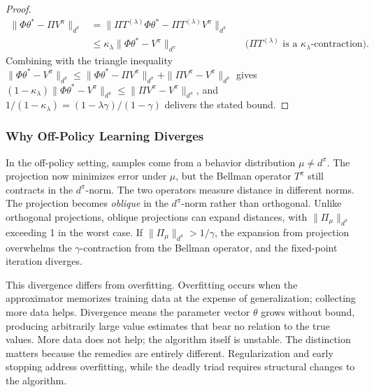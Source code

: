 \begin{proof}
\begin{align*}
\|\Phi\theta^* - \Pi V^\pi\|_{d^\pi}
  &= \|\Pi T^{(\lambda)} \Phi\theta^* - \Pi T^{(\lambda)} V^\pi\|_{d^\pi} \\
  &\leq \kappa_\lambda \|\Phi\theta^* - V^\pi\|_{d^\pi}
    && \text{($\Pi T^{(\lambda)}$ is a $\kappa_\lambda$-contraction).}
\end{align*}
Combining with the triangle inequality $\|\Phi\theta^* - V^\pi\|_{d^\pi} \leq \|\Phi\theta^* - \Pi V^\pi\|_{d^\pi} + \|\Pi V^\pi - V^\pi\|_{d^\pi}$ gives $(1 - \kappa_\lambda)\|\Phi\theta^* - V^\pi\|_{d^\pi} \leq \|\Pi V^\pi - V^\pi\|_{d^\pi}$, and $1/(1-\kappa_\lambda) = (1-\lambda\gamma)/(1-\gamma)$ delivers the stated bound.
\end{proof}

\subsubsection{Why Off-Policy Learning Diverges}

In the off-policy setting, samples come from a behavior distribution $\mu \neq d^\pi$. The projection now minimizes error under $\mu$, but the Bellman operator $T^\pi$ still contracts in the $d^\pi$-norm. The two operators measure distance in different norms. The projection becomes \emph{oblique} in the $d^\pi$-norm rather than orthogonal. Unlike orthogonal projections, oblique projections can expand distances, with $\|\Pi_\mu\|_{d^\pi}$ exceeding 1 in the worst case. If $\|\Pi_\mu\|_{d^\pi} > 1/\gamma$, the expansion from projection overwhelms the $\gamma$-contraction from the Bellman operator, and the fixed-point iteration diverges.

This divergence differs from overfitting. Overfitting occurs when the approximator memorizes training data at the expense of generalization; collecting more data helps. Divergence means the parameter vector $\theta$ grows without bound, producing arbitrarily large value estimates that bear no relation to the true values. More data does not help; the algorithm itself is unstable. The distinction matters because the remedies are entirely different. Regularization and early stopping address overfitting, while the deadly triad requires structural changes to the algorithm.

